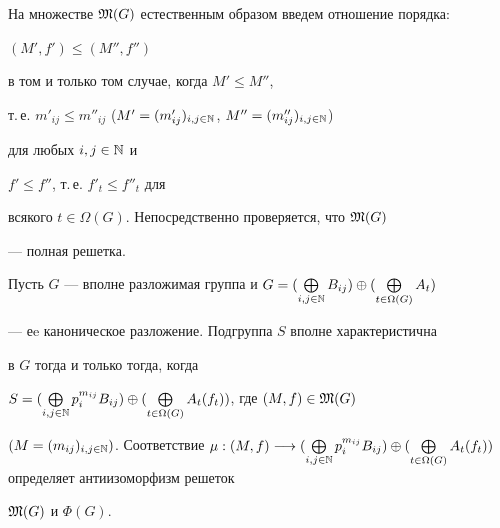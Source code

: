 На множестве $\frak M(G)$ естественным образом введем отношение порядка:


$(M', f')\leqslant (M'', f'')$


в том и только том случае, когда $M'\leqslant M''$,


т.\,е.  $m'_{ij}\leqslant m''_{ij}$ ($M'=


(m'_{ij})_{i,j\in\Bbb N}$, $M''=(m''_{ij})_{i,j\in\Bbb N}$)


для любых $i,j\in\Bbb N$ и


$f'\leqslant f''$, т.\,е. $f'_t\leqslant f''_t$ для


всякого $t\in\Omega(G)$. Непосредственно проверяется, что $\frak M(G)$


--- полная решетка.





\begin{thmnonum}


Пусть $G$ --- вполне разложимая группа и $G=


(\bigoplus\limits_{i,j\in\Bbb N}B_{ij})


\oplus(\bigoplus\limits_{t\in\Omega(G)}A_t)$


--- еe каноническое разложение. Подгруппа $S$ вполне характеристична


в $G$ тогда и только тогда, когда


$S=(\bigoplus\limits_{i,j\in\Bbb N}p_i^{m_{ij}}B_{ij})\oplus


(\bigoplus\limits_{t\in\Omega(G)}A_t(f_t))$, где $(M, f)\in\frak M(G)$


$(M=(m_{ij})_{i,j\in\Bbb N})$. Соответствие $\mu :(M, f)\longrightarrow


(\bigoplus\limits_{i,j\in\Bbb N}p_i^{m_{ij}}B_{ij})\oplus


(\bigoplus\limits_{t\in\Omega(G)}A_t(f_t))$ определяет антиизоморфизм решеток


$\frak M(G)$ и $\Phi(G)$.


\end{thmnonum}





